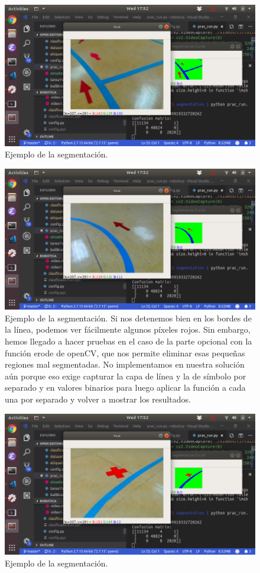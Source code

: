 \documentclass{article}
\begin{document}
	\begin{figure}[H]
	    \centering
	    \includegraphics[width=12cm]{figura1.png}
	    \caption{Ejemplo de la segmentación.} 
	    \label{fig:figura1}
	\end{figure}

	\begin{figure}[H]
	    \centering
	    \includegraphics[width=12cm]{figura2.png}
	    \caption{Ejemplo de la segmentación. Si nos detenemos bien en los bordes de la línea, podemos ver fácilmente algunos píxeles rojos. Sin embargo, hemos llegado a hacer pruebas en el caso de la parte opcional con la función erode de openCV, que nos permite eliminar esas pequeñas regiones mal segmentadas. No implementamos en nuestra solución aún porque eso exige capturar la capa de línea y la de símbolo por separado y en valores binarios para luego aplicar la función a cada una por separado y volver a mostrar los resultados.}
	    \label{fig:figura2}
	\end{figure}

	\begin{figure}[H]
	    \centering
	    \includegraphics[width=12cm]{figura3.png}
	    \caption{Ejemplo de la segmentación.}
	    \label{fig:figura3}
	\end{figure}
\end{document}

